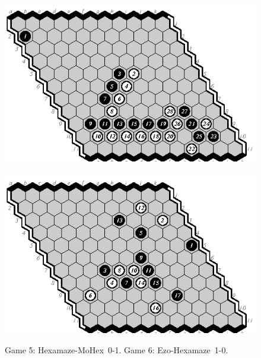 \documentclass{icga}
\def\Eo{\mbox{\sc Ezo}}
\def\Hz{\mbox{\sc Hexamaze}}
\def\Mx{\mbox{\sc MoHex}}
\begin{document}
\begin{figure}[hbp]
\includegraphics[scale=1.3]{games/pix/05-hm-0-1.eps}\hspace*{-1cm}\
\includegraphics[scale=1.3]{games/pix/06-eh-1-0.eps}
\caption{Game 5: \Hz-\Mx\ 0-1. Game 6: \Eo-\Hz\ 1-0.}
\end{figure}
\end{document}
